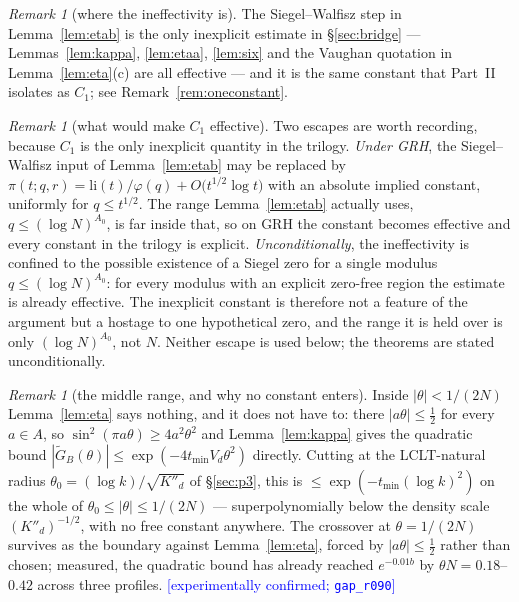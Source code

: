\documentclass[11pt,a4paper]{article}
\theoremstyle{plain}
\theoremstyle{definition}
\theoremstyle{remark}
\newtheorem{remark}[theorem]{Remark}
\newcommand{\STATUS}[1]{\textcolor{blue}{\textsf{[#1]}}}
\begin{document}
\begin{remark}[where the ineffectivity is]\label{rem:whereC1}
The Siegel--Walfisz step in Lemma~\ref{lem:etab} is the only inexplicit estimate in
\S\ref{sec:bridge} --- Lemmas~\ref{lem:kappa}, \ref{lem:etaa}, \ref{lem:six} and the Vaughan
quotation in Lemma~\ref{lem:eta}(c) are all effective --- and it is the same constant that
Part~II isolates as $C_1$; see Remark~\ref{rem:oneconstant}.
\end{remark}

\begin{remark}[what would make $C_1$ effective]\label{rem:grh}
Two escapes are worth recording, because $C_1$ is the only inexplicit quantity in the
trilogy. \emph{Under GRH}, the Siegel--Walfisz input of Lemma~\ref{lem:etab} may be replaced
by $\pi(t;q,r)=\mathrm{li}(t)/\varphi(q)+O\bigl(t^{1/2}\log t\bigr)$ with an absolute implied
constant, uniformly for $q\le t^{1/2}$. The range Lemma~\ref{lem:etab} actually uses,
$q\le(\log N)^{A_0}$, is far inside that, so on GRH the constant becomes effective and every
constant in the trilogy is explicit. \emph{Unconditionally}, the ineffectivity is confined to
the possible existence of a Siegel zero for a single modulus $q\le(\log N)^{A_0}$: for every
modulus with an explicit zero-free region the estimate is already effective. The inexplicit
constant is therefore not a feature of the argument but a hostage to one hypothetical zero,
and the range it is held over is only $(\log N)^{A_0}$, not $N$. Neither escape is used
below; the theorems are stated unconditionally.
\end{remark}

\begin{remark}[the middle range, and why no constant enters]\label{rem:principal}
Inside $|\theta|<1/(2N)$ Lemma~\ref{lem:eta} says nothing, and it does not have to: there
$|a\theta|\le\tfrac12$ for every $a\in A$, so $\sin^{2}(\pi a\theta)\ge4a^{2}\theta^{2}$ and
Lemma~\ref{lem:kappa} gives the quadratic bound
$|\widetilde G_{B}(\theta)|\le\exp(-4t_{\min}V_d\theta^{2})$ directly. Cutting at the
LCLT-natural radius $\theta_0=(\log k)/\sqrt{K''_d}$ of \S\ref{sec:p3}, this is
$\le\exp(-t_{\min}(\log k)^{2})$ on the whole of $\theta_0\le|\theta|\le1/(2N)$ ---
superpolynomially below the density scale $(K''_d)^{-1/2}$, with no free constant anywhere.
The crossover at $\theta=1/(2N)$ survives as the boundary against
Lemma~\ref{lem:eta}, forced by $|a\theta|\le\tfrac12$ rather than chosen; measured, the
quadratic bound has already reached $e^{-0.01b}$ by $\theta N=0.18$--$0.42$ across three
profiles. \STATUS{experimentally confirmed; \texttt{gap\_r090}}
\end{remark}
\end{document}
